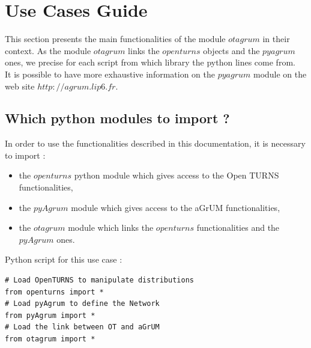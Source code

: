 



\section{Use Cases Guide}

This section presents the main functionalities of the module $otagrum$ in their context. As the module  $otagrum$ links the $openturns$ objects and the $pyagrum$ ones, we precise for each script from which library the python lines come from.\\
It is possible to have more exhaustive information on the $pyagrum$ module on the web site $http://agrum.lip6.fr$.



\subsection{Which python modules to import ?}

In order to use the functionalities described in this documentation, it is necessary to import  : 
\begin{itemize}
   \item the $openturns$ python module which gives access to the Open TURNS functionalities,
   \item the $pyAgrum$ module which gives access to the aGrUM functionalities,
   \item the $otagrum$ module which links the $openturns$ functionalities and the $pyAgrum$ ones.
\end{itemize}

Python  script for this use case :

\begin{lstlisting}
# Load OpenTURNS to manipulate distributions
from openturns import *
# Load pyAgrum to define the Network
from pyAgrum import *
# Load the link between OT and aGrUM
from otagrum import *
\end{lstlisting}


